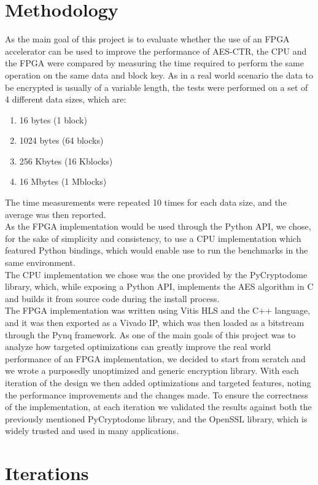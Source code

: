 \documentclass[12pt,oneside,a4paper]{article}
\begin{document}
\section{Methodology} \label{sec:methodology}
As the main goal of this project is to evaluate whether the use of an FPGA accelerator can be used to improve the performance of AES-CTR, the CPU and the FPGA were compared by measuring the time required to perform the same operation on the same data and block key.
As in a real world scenario the data to be encrypted is usually of a variable length, the tests were performed on a set of 4 different data sizes, which are:
\begin{enumerate}
	\item 16 bytes (1 block)
	\item 1024 bytes (64 blocks)
	\item 256 Kbytes (16 Kblocks)
	\item 16 Mbytes (1 Mblocks)
\end{enumerate}
The time measurements were repeated 10 times for each data size, and the average was then reported.
\\As the FPGA implementation would be used through the Python API, we chose, for the sake of simplicity and consistency, to use a CPU implementation which featured Python bindings, which would enable use to run the benchmarks in the same environment.
\\The CPU implementation we chose was the one provided by the PyCryptodome library, which, while exposing a Python API, implements the AES algorithm in C and builds it from source code during the install process.
\\The FPGA implementation was written using Vitis HLS and the C++ language, and it was then exported as a Vivado IP, which was then loaded as a bitstream through the Pynq framework.
As one of the main goals of this project was to analyze how targeted optimizations can greatly improve the real world performance of an FPGA implementation, we decided to start from scratch and we wrote a purposedly unoptimized and generic encryption library.
With each iteration of the design we then added optimizations and targeted features, noting the performance improvements and the changes made.
To ensure the correctness of the implementation, at each iteration we validated the results against both the previously mentioned PyCryptodome library, and the OpenSSL library, which is widely trusted and used in many applications.

\section{Iterations} \label{sec:iterations}
\end{document}
